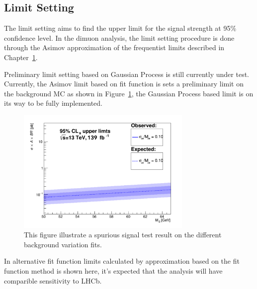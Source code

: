 \begin{itemize}
\section{Limit Setting}
The limit setting aims to find the upper limit for the signal strength at 95\% confidence level. In the dimuon analysis, the limit setting procedure is done through the Asimov approximation of the frequentist limits described in Chapter~\ref{}.

Preliminary limit setting based on Gaussian Process is still currently under test. Currently, the Asimov limit based on fit function is sets a preliminary limit on the background MC as shown in Figure~\ref{}, the Gaussian Process based limit is on its way to be fully implemented. 

\begin{figure}[!htb]
   \begin{center}
       \includegraphics[width=0.75\textwidth]{figures/chapter_dimuon/limits}       
       \caption{
       This figure illustrate a spurious signal test result on the different background variation fits.
       }
    \label{fig:dimuonstudies}
   \end{center}
\end{figure}

In alternative fit function limits calculated by approximation based on the fit function method is shown here, it's expected that the analysis will have comparible sensitivity to LHCb. 


\end{itemize}

